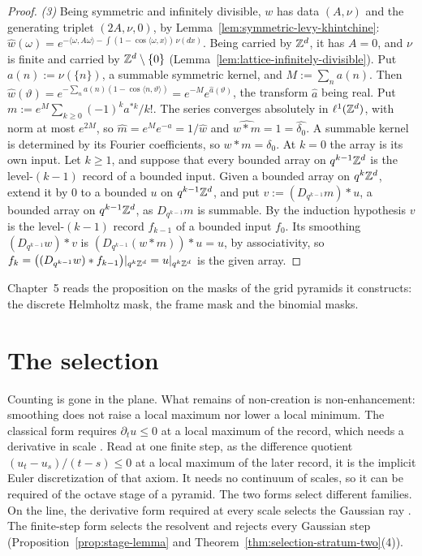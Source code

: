 \begin{proof}
\emph{(3)} Being symmetric and infinitely divisible, $w$ has \Levy{} data $(A, \nu)$ and the
generating triplet $(2A, \nu, 0)$, by Lemma~\ref{lem:symmetric-levy-khintchine}:
$\widehat w(\omega) = e^{-\langle\omega, A\omega\rangle - \int(1 - \cos\langle\omega, x\rangle)\,\nu(dx)}$.
Being carried by $\mathbb{Z}^d$, it has $A = 0$, and $\nu$ is finite and carried by
$\mathbb{Z}^d \setminus \{0\}$ (Lemma~\ref{lem:lattice-infinitely-divisible}). Put $a(n) := \nu(\{n\})$, a
summable symmetric kernel, and $M := \sum_na(n)$. Then
$\widehat w(\vartheta) = e^{-\sum_na(n)(1 - \cos\langle n, \vartheta\rangle)} = e^{-M}e^{\widehat a(\vartheta)}$,
the transform $\widehat a$ being real. Put $m := e^M\sum_{k \ge 0}(-1)^ka^{*k}/k!$. The series
converges absolutely in $\ell^1(\mathbb{Z}^d)$, with norm at most $e^{2M}$, so
$\widehat m = e^Me^{-\widehat a} = 1/\widehat w$ and $\widehat{w * m} = 1 = \widehat{\delta_0}$. A
summable kernel is determined by its Fourier coefficients, so $w * m = \delta_0$. At $k = 0$ the
array is its own input. Let $k \ge 1$, and suppose that every bounded array on $q^{k-1}\mathbb{Z}^d$ is the
level-$(k-1)$ record of a bounded input. Given a bounded array on $q^k\mathbb{Z}^d$, extend it by $0$ to a
bounded $u$ on $q^{k-1}\mathbb{Z}^d$, and put $v := (D_{q^{k-1}}m) * u$, a bounded array on
$q^{k-1}\mathbb{Z}^d$, as $D_{q^{k-1}}m$ is summable. By the induction hypothesis $v$ is the level-$(k-1)$
record $f_{k-1}$ of a bounded input $f_0$. Its smoothing $(D_{q^{k-1}}w) * v$ is
$(D_{q^{k-1}}(w * m)) * u = u$, by associativity, so
$f_k = \bigl((D_{q^{k-1}}w) * f_{k-1}\bigr)|_{q^k\mathbb{Z}^d} = u|_{q^k\mathbb{Z}^d}$ is the given array.
\end{proof}

Chapter~5 reads the proposition on the masks of the grid pyramids it constructs: the discrete
Helmholtz mask, the frame mask and the binomial masks.

\section{The selection}
\label{sec:matern-selection}

Counting is gone in the plane. What remains of non-creation is non-enhancement: smoothing does not
raise a local maximum nor lower a local minimum. The classical form requires $\partial_tu \le 0$ at a
local maximum of the record, which needs a derivative in scale
. Read at one finite step, as the difference quotient
$(u_t - u_s)/(t - s) \le 0$ at a local maximum of the later record, it is the implicit Euler
discretization of that axiom. It needs no continuum of scales, so it can be required of the octave
stage of a pyramid. The two forms select different families. On the line, the derivative form required
at every scale selects the Gaussian ray . The finite-step form selects the resolvent and rejects every Gaussian step
(Proposition~\ref{prop:stage-lemma} and Theorem~\ref{thm:selection-stratum-two}(4)).

